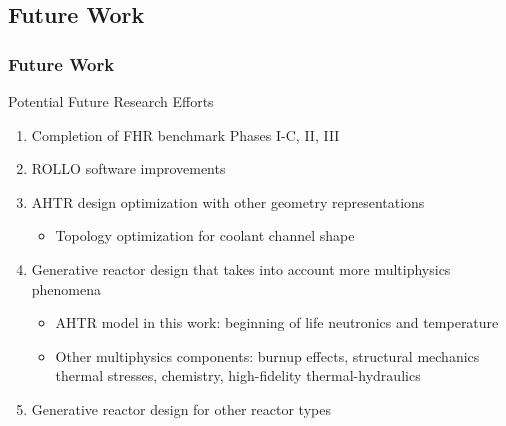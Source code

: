 \subsection{Future Work}
\begin{frame}
    \frametitle{Future Work}
    \begin{block}{Potential Future Research Efforts}
    \begin{enumerate}
        \item Completion of FHR benchmark Phases I-C, II, III
        \item ROLLO software improvements 
        \item AHTR design optimization with other geometry representations 
            \begin{itemize}
                \item Topology optimization for coolant channel shape 
            \end{itemize}
        \item Generative reactor design that takes into account more multiphysics phenomena 
            \begin{itemize}
                \item AHTR model in this work: beginning of life neutronics and temperature 
                \item Other multiphysics components: burnup effects, structural mechanics 
                thermal stresses, chemistry, high-fidelity thermal-hydraulics 
            \end{itemize}
        \item Generative reactor design for other reactor types
    \end{enumerate}
    \end{block}
\end{frame}